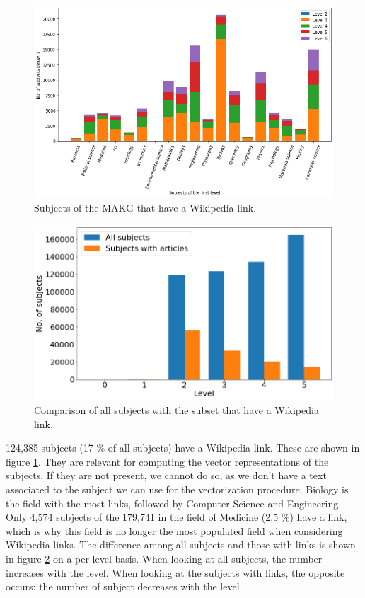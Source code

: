 \begin{figure}
    \centering
    \includegraphics[width=\textwidth]{figures/related_work/makg/subjects_w_article.png}
    \caption{Subjects of the MAKG that have a Wikipedia link.}
    \label{fig:subjects_w_article}
\end{figure}

\begin{figure}
    \centering
    \includegraphics[width=.75\textwidth]{figures/related_work/makg/subject_distribution_comparison.png}
    \caption{Comparison of all subjects with the subset that have a Wikipedia link.}
    \label{fig:subject_distribution_comparison}
\end{figure}

124,385 subjects (17 \% of all subjects) have a Wikipedia link. These are shown in figure \ref{fig:subjects_w_article}. They are relevant for computing the vector representations of the subjects. If they are not present, we cannot do so, as we don't have a text associated to the subject we can use for the vectorization procedure. Biology is the field with the most links, followed by Computer Science and Engineering. Only 4,574 subjects of the 179,741 in the field of Medicine (2.5 \%) have a link, which is why this field is no longer the most populated field when considering Wikipedia links. The difference among all subjects and those with links is shown in figure \ref{fig:subject_distribution_comparison} on a per-level basis. When looking at all subjects, the number increases with the level. When looking at the subjects with links, the opposite occurs: the number of subject decreases with the level.

